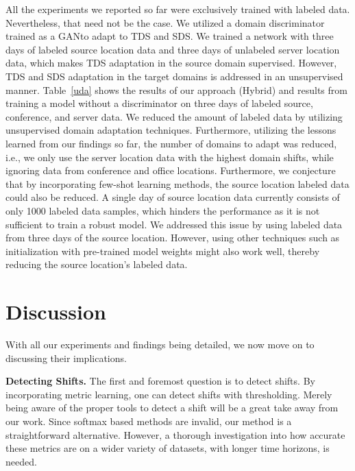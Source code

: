 \documentclass{article}
\begin{document}
All the experiments we reported so far were exclusively trained with labeled data. Nevertheless, that need not be the case. We utilized a domain discriminator trained as a GAN\footnotemark[2] to adapt to TDS and SDS. We trained a network with three days of labeled source location data and three days of unlabeled server location data, which makes TDS adaptation in the source domain supervised. However, TDS and SDS adaptation in the target domains is addressed in an unsupervised manner. Table~\ref{uda} shows the results of our approach (Hybrid) and results from training a model without a discriminator on three days of labeled source, conference, and server data. We reduced the amount of labeled data by utilizing unsupervised domain adaptation techniques. Furthermore, utilizing the lessons learned from our findings so far, the number of domains to adapt was reduced, i.e., we only use the server location data with the highest domain shifts, while ignoring data from conference and office locations. Furthermore, we conjecture that by incorporating few-shot learning methods, the source location labeled data could also be reduced. A single day of source location data currently consists of only 1000 labeled data samples, which hinders the performance as it is not sufficient to train a robust model. We addressed this issue by using labeled data from three days of the source location. However, using other techniques such as initialization with pre-trained model weights might also work well, thereby reducing the source location's labeled data.

\section{Discussion}
With all our experiments and findings being detailed, we now move on to discussing their implications. 

\textbf{Detecting Shifts.} The first and foremost question is to detect shifts. By incorporating metric learning, one can detect shifts with thresholding. Merely being aware of the proper tools to detect a shift will be a great take away from our work. Since softmax based methods are invalid,  our method is a straightforward alternative. However, a thorough investigation into how accurate these metrics are on a wider variety of datasets, with longer time horizons, is needed. 
\end{document}
